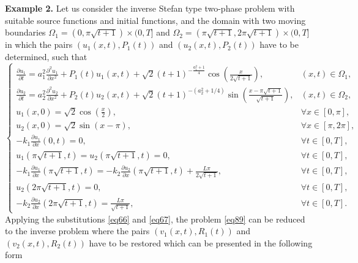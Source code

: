 \documentclass[preprint,12pt,authoryear]{elsarticle}
\begin{document}
\textbf{Example 2.} Let us consider the inverse Stefan type two-phase problem with suitable source functions and initial functions, and the domain with two moving boundaries  $\Omega_1=(0,\pi\sqrt{t+1})\times(0,T]$ and $\Omega_2=(\pi\sqrt{t+1},2\pi\sqrt{t+1})\times(0,T]$ in which the pairs $(u_1(x,t),P_1(t))$ and $(u_2(x,t),P_2(t))$ have to be determined, such that
\begin{equation}\label{eq89}
    \begin{cases}
        \frac{\partial u_1}{\partial t}=a_1^2\frac{\partial^2 u_1}{\partial x^2}+P_1(t)u_1(x,t)+\sqrt{2}(t+1)^{-\frac{a_1^2+1}{4}}\cos\left(\frac{x}{2\sqrt{t+1}}\right),&(x,t)\in\Omega_1,\\
        \frac{\partial u_2}{\partial t}=a_2^2\frac{\partial^2 u_2}{\partial x^2}+P_2(t)u_2(x,t)+\sqrt{2}(t+1)^{-(a_2^2+1/4)}\sin\left(\frac{x-\pi\sqrt{t+1}}{\sqrt{t+1}}\right),&(x,t)\in\Omega_2,\\
        u_1(x,0)=\sqrt{2}\cos\left(\frac{x}{2}\right),&\forall x\in[0,\pi],\\
        u_2(x,0)=\sqrt{2}\sin\left(x-\pi\right),&\forall x\in[\pi,2\pi],\\
        -k_1\frac{\partial u_1}{\partial x}(0,t)=0,&\forall t\in[0,T],\\
        u_1(\pi\sqrt{t+1},t)=u_2(\pi\sqrt{t+1},t)=0,&\forall t\in[0,T],\\
        -k_1\frac{\partial u_1}{\partial x}(\pi\sqrt{t+1},t)=-k_2\frac{\partial u_2}{\partial x}(\pi\sqrt{t+1},t)+\frac{L\pi}{2\sqrt{t+1}},&\forall t\in[0,T],\\
        u_2(2\pi\sqrt{t+1},t)=0,&\forall t\in[0,T],\\
        -k_2\frac{\partial u_2}{\partial x}(2\pi\sqrt{t+1},t)=\frac{L\pi}{\sqrt{t+1}},&\forall t\in[0,T].
    \end{cases}
\end{equation}
Applying the substitutions \eqref{eq66} and \eqref{eq67}, the problem \eqref{eq89} can be reduced to the inverse problem where the pairs $(v_1(x,t),R_1(t))$ and $(v_2(x,t),R_2(t))$ have to be restored which can be presented in the following form
\end{document}
